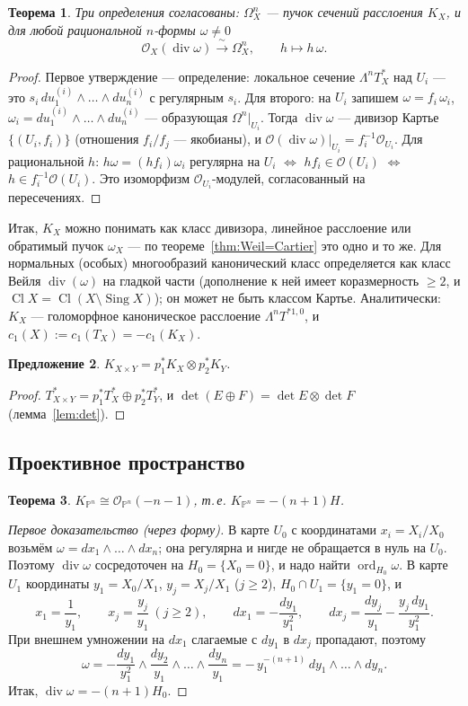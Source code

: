 \documentclass[11pt,a4paper]{article}
\theoremstyle{plain}
\newtheorem{theorem}{Теорема}[section]
\newtheorem{proposition}[theorem]{Предложение}
\theoremstyle{definition}
\theoremstyle{remark}
\newcommand{\PP}{\mathbb{P}}
\newcommand{\cO}{\mathcal{O}}
\DeclareMathOperator{\Cl}{Cl}
\DeclareMathOperator{\divv}{div}
\DeclareMathOperator{\ord}{ord}
\DeclareMathOperator{\Sing}{Sing}
\begin{document}
\begin{theorem}
Три определения согласованы: $\Omega^n_X$ --- пучок сечений расслоения $K_X$, и для любой
рациональной $n$-формы $\omega\ne0$
\[
\cO_X(\divv\omega)\xrightarrow{\ \sim\ }\Omega^n_X,\qquad h\mapsto h\,\omega.
\]
\end{theorem}
\begin{proof}
Первое утверждение --- определение: локальное сечение $\Lambda^nT^*_X$ над $U_i$ ---
это $s_i\,du^{(i)}_1\wedge\dots\wedge du^{(i)}_n$ с регулярным $s_i$. Для второго: на $U_i$
запишем $\omega=f_i\,\omega_i$, $\omega_i=du^{(i)}_1\wedge\dots\wedge du^{(i)}_n$ --- образующая
$\Omega^n|_{U_i}$. Тогда $\divv\omega$ --- дивизор Картье $\{(U_i,f_i)\}$ (отношения $f_i/f_j$ ---
якобианы), и $\cO(\divv\omega)|_{U_i}=f_i^{-1}\cO_{U_i}$. Для рациональной $h$:
$h\omega=(hf_i)\omega_i$ регулярна на $U_i$ $\iff$ $hf_i\in\cO(U_i)$ $\iff$
$h\in f_i^{-1}\cO(U_i)$. Это изоморфизм $\cO_{U_i}$-модулей, согласованный на пересечениях.
\end{proof}

Итак, $K_X$ можно понимать как класс дивизора, линейное расслоение или обратимый пучок
$\omega_X$ --- по теореме~\ref{thm:Weil=Cartier} это одно и то же. Для нормальных (особых)
многообразий канонический класс определяется как класс Вейля $\divv(\omega)$ на гладкой части
(дополнение к ней имеет коразмерность $\ge2$, и $\Cl X=\Cl(X\setminus\Sing X)$); он может не быть
классом Картье. Аналитически: $K_X$ --- голоморфное каноническое расслоение $\Lambda^nT^{*1,0}$, и
$c_1(X):=c_1(T_X)=-c_1(K_X)$.

\begin{proposition}\label{prop:K-product}
$K_{X\times Y}=p_1^*K_X\otimes p_2^*K_Y$.
\end{proposition}
\begin{proof}
$T^*_{X\times Y}=p_1^*T^*_X\oplus p_2^*T^*_Y$, и $\det(E\oplus F)=\det E\otimes\det F$
(лемма~\ref{lem:det}).
\end{proof}

\subsection{Проективное пространство}

\begin{theorem}\label{thm:KPn}
$K_{\PP^n}\cong\cO_{\PP^n}(-n-1)$, т.\,е. $K_{\PP^n}=-(n+1)H$.
\end{theorem}
\begin{proof}[Первое доказательство (через форму)]
В карте $U_0$ с координатами $x_i=X_i/X_0$ возьмём $\omega=dx_1\wedge\dots\wedge dx_n$; она
регулярна и нигде не обращается в нуль на $U_0$. Поэтому $\divv\omega$ сосредоточен на
$H_0=\{X_0=0\}$, и надо найти $\ord_{H_0}\omega$. В карте $U_1$ координаты
$y_1=X_0/X_1$, $y_j=X_j/X_1$ ($j\ge2$), $H_0\cap U_1=\{y_1=0\}$, и
\[
x_1=\frac1{y_1},\qquad x_j=\frac{y_j}{y_1}\ (j\ge2),\qquad
dx_1=-\frac{dy_1}{y_1^2},\qquad dx_j=\frac{dy_j}{y_1}-\frac{y_j\,dy_1}{y_1^2}.
\]
При внешнем умножении на $dx_1$ слагаемые с $dy_1$ в $dx_j$ пропадают, поэтому
\[
\omega=-\frac{dy_1}{y_1^2}\wedge\frac{dy_2}{y_1}\wedge\dots\wedge\frac{dy_n}{y_1}
=-\,y_1^{-(n+1)}\,dy_1\wedge\dots\wedge dy_n .
\]
Итак, $\divv\omega=-(n+1)H_0$.
\end{proof}
\end{document}
